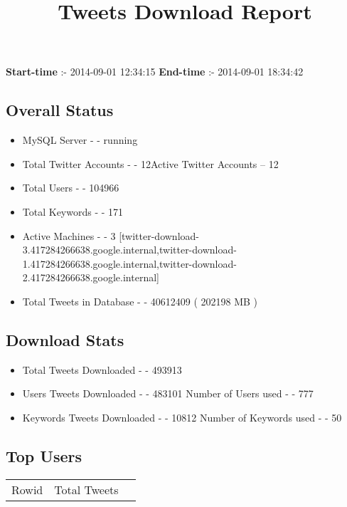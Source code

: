 \documentclass{article}\usepackage[T1]{fontenc}
\begin{document}
\title{\textbf{Tweets Download Report}}
               \date{}
                \maketitle
               \centerline{\textbf{Start-time} :- 2014-09-01 12:34:15 \hspace{40pt} \textbf{End-time} :- 2014-09-01 18:34:42}               \subsection*{Overall Status}                \begin{itemize}                \item MySQL Server - - running               \item Total Twitter Accounts - - 12\newline Active Twitter Accounts -- 12               \item Total Users - - 104966               \item Total Keywords - - 171               \item Active Machines - - 3 [twitter-download-3.417284266638.google.internal,twitter-download-1.417284266638.google.internal,twitter-download-2.417284266638.google.internal]               \item Total Tweets in Database - - 40612409 ( 202198 MB )               \end{itemize}               \subsection*{Download Stats}                \begin{itemize}                \item Total Tweets Downloaded - - 493913               \item Users Tweets Downloaded - - 483101 \newline Number of Users used - - 777               \item Keywords Tweets Downloaded - - 10812 \newline Number of Keywords used - - 50              \end{itemize}              \subsection*{Top Users}\begin{tabular}{|c|c|c|}         \hline         Rowid & Total Tweets \\ 

\end{tabular}
\end{document}
